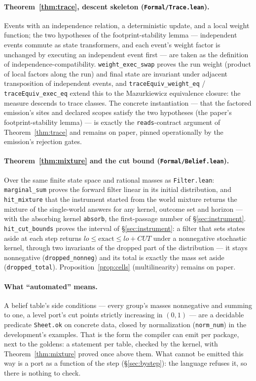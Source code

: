 \documentclass[11pt]{article}
\theoremstyle{plain}
\theoremstyle{definition}
\theoremstyle{remark}
\begin{document}
\paragraph{Theorem~\ref{thm:trace}, descent skeleton
(\texttt{Formal/Trace.lean}).} Events with an independence relation,
a deterministic update, and a local weight function; the two
hypotheses of the footprint-stability lemma --- independent events
commute as state transformers, and each event's weight factor is
unchanged by executing an independent event first --- are taken as the
definition of independence-compatibility. \texttt{weight\_exec\_swap}
proves the run weight (product of local factors along the run) and
final state are invariant under adjacent transposition of independent
events, and \texttt{traceEquiv\_weight\_eq} /
\texttt{traceEquiv\_exec\_eq} extend this to the Mazurkiewicz
equivalence closure: the measure descends to trace classes. The concrete instantiation --- that the factored emission's
sites and declared scopes satisfy the two hypotheses (the paper's
footprint-stability lemma) --- is exactly the \texttt{reads}-contract
argument of Theorem~\ref{thm:trace} and remains on paper, pinned
operationally by the emission's rejection gates.

\paragraph{Theorem~\ref{thm:mixture} and the cut bound
(\texttt{Formal/Belief.lean}).} Over the same finite state space and
rational masses as \texttt{Filter.lean}: \texttt{marginal\_sum} proves
the forward filter linear in its initial distribution, and
\texttt{hit\_mixture} that the instrument started from the world
mixture returns the mixture of the single-world answers for any kernel,
outcome set and horizon --- with the absorbing kernel \texttt{absorb},
the first-passage number of \S\ref{sec:instrument}.
\texttt{hit\_cut\_bounds} proves the interval of \S\ref{sec:instrument}:
a filter that sets states aside at each step returns $\mathit{lo} \le
\text{exact} \le \mathit{lo} + \mathit{CUT}$ under a nonnegative
stochastic kernel, through two invariants of the dropped part of the
distribution --- it stays nonnegative (\texttt{dropped\_nonneg}) and
its total is exactly the mass set aside (\texttt{dropped\_total}).
Proposition~\ref{prop:cells} (multilinearity) remains on paper.

\paragraph{What ``automated'' means.} A belief table's side
conditions --- every group's masses nonnegative and summing to one, a
level port's cut points strictly increasing in $(0,1)$ --- are a
decidable predicate \texttt{Sheet.ok} on concrete data, closed by
normalization (\texttt{norm\_num}) in the development's examples. That
is the form the compiler can emit per package, next to the goldens: a
statement per table, checked by the kernel, with
Theorem~\ref{thm:mixture} proved once above them. What cannot be
emitted this way is a port as a function of the step
(\S\ref{sec:bystep}): the language refuses it, so there is nothing to
check.
\end{document}
